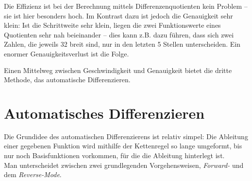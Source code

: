 \documentclass{scrartcl}
\begin{document}
Die Effizienz ist bei der Berechnung mittels Differenzenquotienten kein Problem -- sie ist hier besonders hoch. Im Kontrast dazu ist jedoch die Genauigkeit sehr klein: Ist die Schrittweite sehr klein, liegen die zwei Funktionswerte eines Quotienten sehr nah beieinander -- dies kann z.B. dazu führen, dass sich zwei Zahlen, die jeweils \SI{32}{\Bit} breit sind, nur in den letzten 5 Stellen unterscheiden. Ein enormer Genauigkeitsverlust ist die Folge.\par
Einen Mittelweg zwischen Geschwindigkeit und Genauigkeit bietet die dritte Methode, das automatische Differenzieren.
\section{Automatisches Differenzieren}
Die Grundidee des automatischen Differenzierens ist relativ simpel: Die Ableitung einer gegebenen Funktion wird mithilfe der Kettenregel so lange umgeformt, bis nur noch Basisfunktionen vorkommen, für die die Ableitung hinterlegt ist.\\
Man unterscheidet zwischen zwei grundlegenden Vorgehensweisen, \emph{Forward-} und dem \emph{Reverse-Mode}.
\end{document}
